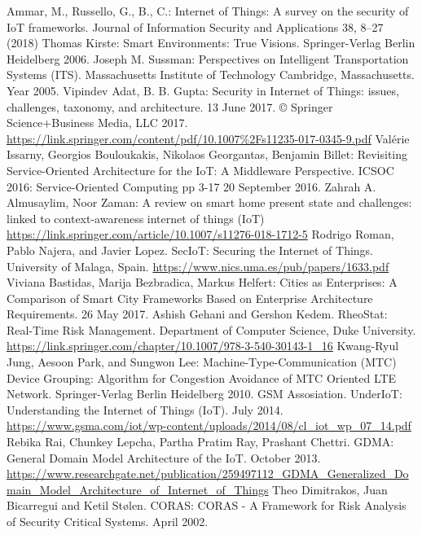\documentclass[12pt]{article}
\begin{document}
\begin{thebibliography}{9}
	Ammar, M., Russello, G., B., C.: Internet of Things: A survey on the security of IoT frameworks. Journal of Information Security and Applications 38, 8–27 (2018)
	Thomas Kirste: Smart Environments: True Visions.
	Springer-Verlag Berlin Heidelberg 2006.
	Joseph M. Sussman: Perspectives on Intelligent Transportation Systems (ITS).
	Massachusetts Institute of Technology
	Cambridge, Massachusetts.
	Year 2005.
	Vipindev Adat, B. B. Gupta: Security in Internet of Things: issues, challenges, taxonomy, and architecture.
	13 June 2017.
	© Springer Science+Business Media, LLC 2017.
	\url{https://link.springer.com/content/pdf/10.1007%2Fs11235-017-0345-9.pdf}
	Valérie Issarny, Georgios Bouloukakis, Nikolaos Georgantas, Benjamin Billet: Revisiting Service-Oriented Architecture for the IoT: A Middleware Perspective.
	ICSOC 2016: Service-Oriented Computing pp 3-17
	20 September 2016.
	Zahrah A. Almusaylim, Noor Zaman: A review on smart home present state and challenges: linked to context-awareness internet of things (IoT)
	\url{https://link.springer.com/article/10.1007/s11276-018-1712-5}
	Rodrigo Roman, Pablo Najera, and Javier Lopez.
	SecIoT: Securing the Internet of Things.
	University of Malaga, Spain.
	\url{https://www.nics.uma.es/pub/papers/1633.pdf}
	Viviana Bastidas, Marija Bezbradica, Markus Helfert: Cities as Enterprises: A Comparison of Smart City Frameworks Based on Enterprise Architecture Requirements. 
	26 May 2017.
	Ashish Gehani and Gershon Kedem.
	RheoStat: Real-Time Risk Management.
	Department of Computer Science, Duke University.
	\url{https://link.springer.com/chapter/10.1007/978-3-540-30143-1_16}
	Kwang-Ryul Jung, Aesoon Park, and Sungwon Lee: Machine-Type-Communication (MTC) Device Grouping: Algorithm for Congestion Avoidance of MTC Oriented
	LTE Network.
	 Springer-Verlag Berlin Heidelberg 2010.
	GSM Assosiation.
	UnderIoT: Understanding the Internet of Things (IoT).
	July 2014.
	\url{https://www.gsma.com/iot/wp-content/uploads/2014/08/cl_iot_wp_07_14.pdf}
	Rebika Rai, Chunkey Lepcha, Partha Pratim Ray, Prashant Chettri.
	GDMA: General Domain Model Architecture of the IoT.
	October 2013.
	\url{https://www.researchgate.net/publication/259497112_GDMA_Generalized_Domain_Model_Architecture_of_Internet_of_Things}
	Theo Dimitrakos, Juan Bicarregui and Ketil Stølen.
	CORAS: CORAS - A Framework for Risk Analysis of Security Critical Systems.
	April 2002.

\end{thebibliography}
\end{document}
